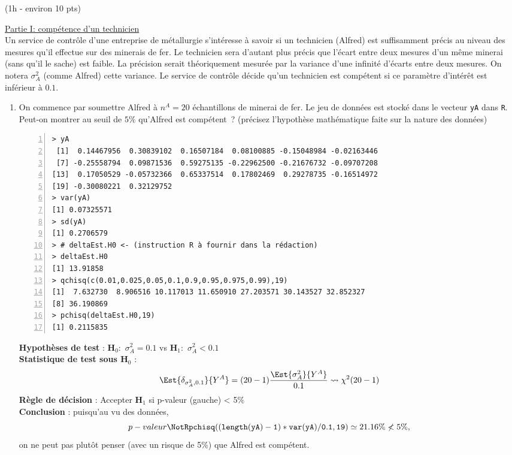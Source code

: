 \documentclass[10pt]{report}
\begin{document}
\begin{exercice} (1h - environ 10 pts)

\noindent \underline{Partie I: compétence d'un technicien} \\

Un service de contr{\^o}le d'une entreprise de m{\'e}tallurgie s'int{\'e}resse {\`a} savoir si un technicien (Alfred) est suffisamment pr{\'e}cis au niveau des mesures qu'il effectue sur des minerais de fer. Le technicien sera d'autant plus précis que l'écart entre deux mesures d'un même minerai (sans qu'il le sache) est faible. La précision serait théoriquement mesurée  par la variance d'une infinité d'écarts entre deux mesures. On notera $\sigma^2_A$ (comme Alfred) cette variance.  Le service de contr{\^o}le d{\'e}cide qu'un technicien est comp{\'e}tent si ce param{\`e}tre d'int{\'e}r{\^e}t est inf{\'e}rieur {\`a} $0.1$. \\ 

\begin{enumerate}
\item On commence par soumettre Alfred à $n^A=20$ échantillons de minerai de fer. Le jeu de données est stocké dans le vecteur \texttt{yA} dans \texttt{R}. Peut-on montrer au seuil de $5\%$ qu'Alfred est compétent~? (précisez l'hypothèse mathématique faite sur la nature des données)

\IndicR
\begin{Verbatim}[frame=leftline,fontfamily=tt,fontshape=n,numbers=left]
> yA
 [1]  0.14467956  0.30839102  0.16507184  0.08100885 -0.15048984 -0.02163446
 [7] -0.25558794  0.09871536  0.59275135 -0.22962500 -0.21676732 -0.09707208
[13]  0.17050529 -0.05732366  0.65337514  0.17802469  0.29278735 -0.16514972
[19] -0.30080221  0.32129752
> var(yA)
[1] 0.07325571
> sd(yA)
[1] 0.2706579
> # deltaEst.H0 <- (instruction R à fournir dans la rédaction)
> deltaEst.H0
[1] 13.91858
> qchisq(c(0.01,0.025,0.05,0.1,0.9,0.95,0.975,0.99),19)
[1]  7.632730  8.906516 10.117013 11.650910 27.203571 30.143527 32.852327
[8] 36.190869
> pchisq(deltaEst.H0,19)
[1] 0.2115835
\end{Verbatim}



\begin{Correction}

\noindent \textbf{Hypothèses de test} : $\mathbf{H}_0:$ $\sigma^2_{A}=0.1$ vs {\large $\mathbf{H}_1:$ $\sigma^2_{A}<0.1$}\\
\textbf{Statistique de test sous $\mathbf{H}_0$} :
  $$
  \Est{\delta_{\sigma^2_{A},0.1}}{Y^{A}}= {\displaystyle (20-1)\frac{\Est{\sigma^2_{A}}{Y^{A}}}{0.1}} 
  \leadsto \chi^2(20-1)
  $$
\textbf{Règle de décision} : Accepter $\mathbf{H}_1$ si 
  p-valeur (gauche) < 5\%\\
\noindent \textbf{Conclusion} :
puisqu'au vu des données, 
  \[
p-valeur\NotR\mathtt{pchisq((length(yA)-1)*var(yA)/0.1,19)} \simeq 21.16\%\nless5\%,
\]
on ne peut pas plutôt penser (avec un risque de 5\%) que Alfred est compétent.
\end{Correction}



\end{enumerate}
\end{exercice}
\end{document}
